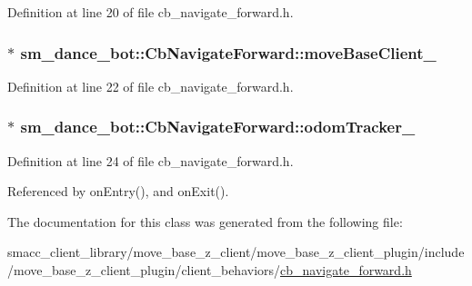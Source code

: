 Definition at line 20 of file cb\+\_\+navigate\+\_\+forward.\+h.

\subsubsection[{\texorpdfstring{move\+Base\+Client\+\_\+}{moveBaseClient_}}]{ $\ast$ sm\+\_\+dance\+\_\+bot\+::\+Cb\+Navigate\+Forward\+::move\+Base\+Client\+\_\+}\hypertarget{classsm__dance__bot_1_1CbNavigateForward_aa8925dbb246e8decc95e226818fa63ea}{}\label{classsm__dance__bot_1_1CbNavigateForward_aa8925dbb246e8decc95e226818fa63ea}


Definition at line 22 of file cb\+\_\+navigate\+\_\+forward.\+h.

\subsubsection[{\texorpdfstring{odom\+Tracker\+\_\+}{odomTracker_}}]{$\ast$ sm\+\_\+dance\+\_\+bot\+::\+Cb\+Navigate\+Forward\+::odom\+Tracker\+\_\+}\hypertarget{classsm__dance__bot_1_1CbNavigateForward_a203a34ea3c943646b29dde9756b1f595}{}\label{classsm__dance__bot_1_1CbNavigateForward_a203a34ea3c943646b29dde9756b1f595}


Definition at line 24 of file cb\+\_\+navigate\+\_\+forward.\+h.



Referenced by on\+Entry(), and on\+Exit().



The documentation for this class was generated from the following file\+:\begin{DoxyCompactItemize}
\item 
smacc\+\_\+client\+\_\+library/move\+\_\+base\+\_\+z\+\_\+client/move\+\_\+base\+\_\+z\+\_\+client\+\_\+plugin/include/move\+\_\+base\+\_\+z\+\_\+client\+\_\+plugin/client\+\_\+behaviors/\hyperlink{smacc__client__library_2move__base__z__client_2move__base__z__client__plugin_2include_2move__bas3f31d4d52bbf09e30133b849422d4b0f}{cb\+\_\+navigate\+\_\+forward.\+h}\end{DoxyCompactItemize}
